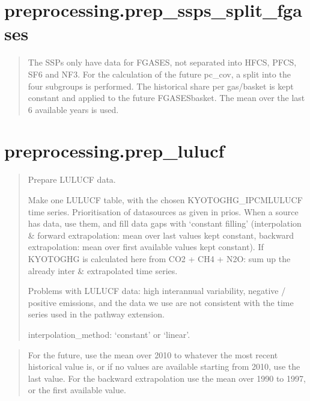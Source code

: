 \documentclass[letterpaper,10pt,english]{sphinxmanual}
\begin{document}
\chapter{preprocessing.prep\_ssps\_split\_fgases}
\label{\detokenize{code:preprocessing-prep-ssps-split-fgases}}
\begin{quote}

The SSPs only have data for FGASES, not separated into HFCS, PFCS, SF6 and NF3.
For the calculation of the future pc\_cov, a split into the four subgroups is performed.
The historical share per gas/basket is kept constant and applied to the future FGASES\sphinxhyphen{}basket.
The mean over the last 6 available years is used.
\end{quote}



\chapter{preprocessing.prep\_lulucf}
\label{\detokenize{code:preprocessing-prep-lulucf}}
\begin{quote}

Prepare LULUCF data.

Make one LULUCF table, with the chosen KYOTOGHG\_IPCMLULUCF time series.
Prioritisation of data\sphinxhyphen{}sources as given in prios.
When a source has data, use them, and fill data gaps with ‘constant filling’
(interpolation \& forward extrapolation: mean over last values kept constant,
backward extrapolation: mean over first available values kept constant).
If KYOTOGHG is calculated here from CO2 + CH4 + N2O: sum up the already inter\sphinxhyphen{} \& extrapolated time series.

Problems with LULUCF data: high inter\sphinxhyphen{}annual variability, negative / positive emissions,
and the data we use are not consistent with the time series used in the pathway extension.

interpolation\_method: ‘constant’ or ‘linear’.
\end{quote}

\begin{quote}

For the future, use the mean over 2010 to whatever the most recent historical value is,
or if no values are available starting from 2010, use the last value.
For the backward extrapolation use the mean over 1990 to 1997, or the first available value.
\end{quote}
\end{document}
